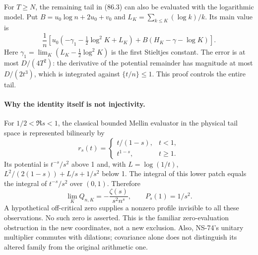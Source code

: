 For $T\geq N$, the remaining tail in (86.3) can also be evaluated with
the logarithmic model. Put $B=u_0\log n+2u_0+v_0$ and
$L_K=\sum_{k\leq K}(\log k)/k$. Its main value is
\[
 \frac1n\left[u_0\left(-\gamma_1-\tfrac12\log^2K+L_K\right)
       +B\left(H_K-\gamma-\log K\right)\right].
\]
Here $\gamma_1=\lim_K(L_K-\tfrac12\log^2K)$ is the first Stieltjes
constant. The error is at most $D/(4T^2)$: the derivative of the
potential remainder has magnitude at most $D/(2t^3)$, which is integrated
against $\{t/n\}\leq1$. This proof controls the entire tail.

\paragraph{Why the identity itself is not injectivity.}
For $1/2<\Re s<1$, the classical bounded Mellin evaluator in the physical
tail space is represented bilinearly by
\[
 r_s(t)=\begin{cases}t/(1-s),&t<1,\\t^{1-s},&t\geq1.\end{cases}
\]
Its potential is $t^{-s}/s^2$ above 1 and, with $L=\log(1/t)$,
$L^2/(2(1-s))+L/s+1/s^2$ below 1. The integral of this lower patch
equals the integral of $t^{-s}/s^2$ over $(0,1)$. Therefore
\[
 \lim_K Q_{n,K}=-\frac{\zeta(s)}{s^2n^s},\qquad P_s(1)=1/s^2.
\]
A hypothetical off-critical zero supplies a nonzero profile invisible to
all these observations. No such zero is asserted. This is the familiar
zero-evaluation obstruction in the new coordinates, not a new exclusion.
Also, NS-74's unitary multiplier commutes with dilations; covariance alone
does not distinguish its altered family from the original arithmetic one.

